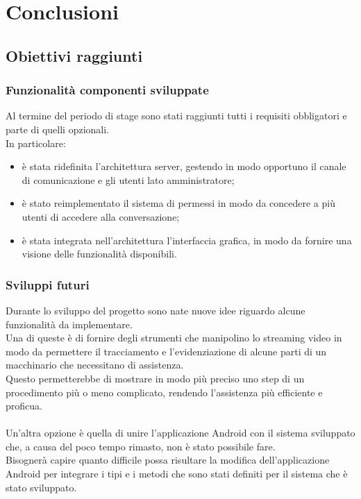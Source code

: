\cleardoublepage
\chapter{Conclusioni}
  \section{Obiettivi raggiunti}
    \subsection{Funzionalità componenti sviluppate}
    Al termine del periodo di stage sono stati raggiunti tutti i requisiti obbligatori e parte di quelli opzionali.\\
    In particolare:
    \begin{itemize}
      \item è stata ridefinita l'architettura server, gestendo in modo opportuno il canale di comunicazione e gli utenti lato amministratore;
      \item è stato reimplementato il sistema di permessi in modo da concedere a più utenti di accedere alla conversazione;
      \item è stata integrata nell'architettura l'interfaccia grafica, in modo da fornire una visione delle funzionalità disponibili.
    \end{itemize}
    \subsection{Sviluppi futuri}
      Durante lo sviluppo del progetto sono nate nuove idee riguardo alcune funzionalità da implementare.\\
      Una di queste è di fornire degli strumenti che manipolino lo streaming video in modo da permettere il tracciamento e l'evidenziazione di alcune parti di un macchinario che necessitano di assistenza.\\
      Questo permetterebbe di mostrare in modo più preciso uno step di un procedimento più o meno complicato, rendendo l'assistenza più efficiente e proficua.\\\\
      Un'altra opzione è quella di unire l'applicazione Android con il sistema sviluppato che, a causa del poco tempo rimasto, non è stato possibile fare.\\
      Bisognerà capire quanto difficile possa risultare la modifica dell'applicazione Android per integrare i tipi e i metodi che sono stati definiti per il sistema che è stato sviluppato.
